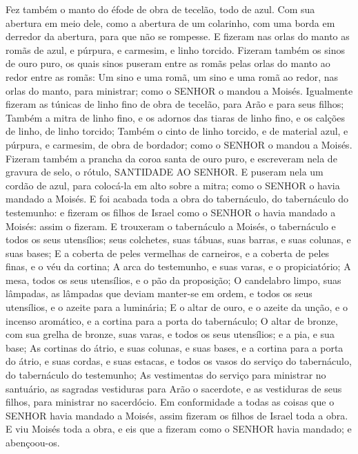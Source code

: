 {Fez também o manto do éfode de obra de tecelão, todo de azul.
Com sua abertura em meio dele, como a abertura de um colarinho, com uma borda em derredor da abertura, para que não se rompesse.
E fizeram nas orlas do manto as romãs de azul, e púrpura, e carmesim, e linho torcido.
Fizeram também os sinos de ouro puro, os quais sinos puseram entre as romãs pelas orlas do manto ao redor entre as romãs:
Um sino e uma romã, um sino e uma romã ao redor, nas orlas do manto, para ministrar; como o SENHOR o mandou a Moisés.
Igualmente fizeram as túnicas de linho fino de obra de tecelão, para Arão e para seus filhos;
Também a mitra de linho fino, e os adornos das tiaras de linho fino, e os calções de linho, de linho torcido;
Também o cinto de linho torcido, e de material azul, e púrpura, e carmesim, de obra de bordador; como o SENHOR o mandou a Moisés.
Fizeram também a prancha da coroa santa de ouro puro, e escreveram nela de gravura de selo, o rótulo, SANTIDADE AO SENHOR.
E puseram nela um cordão de azul, para colocá-la em alto sobre a mitra; como o SENHOR o havia mandado a Moisés.
E foi acabada toda a obra do tabernáculo, do tabernáculo do testemunho: e fizeram os filhos de Israel como o SENHOR o havia mandado a Moisés: assim o fizeram.
E trouxeram o tabernáculo a Moisés, o tabernáculo e todos os seus utensílios; seus colchetes, suas tábuas, suas barras, e suas colunas, e suas bases;
E a coberta de peles vermelhas de carneiros, e a coberta de peles finas, e o véu da cortina;
A arca do testemunho, e suas varas, e o propiciatório;
A mesa, todos os seus utensílios, e o pão da proposição;
O candelabro limpo, suas lâmpadas, as lâmpadas que deviam manter-se em ordem, e todos os seus utensílios, e o azeite para a luminária;
E o altar de ouro, e o azeite da unção, e o incenso aromático, e a cortina para a porta do tabernáculo;
O altar de bronze, com sua grelha de bronze, suas varas, e todos os seus utensílios; e a pia, e sua base;
As cortinas do átrio, e suas colunas, e suas bases, e a cortina para a porta do átrio, e suas cordas, e suas estacas, e todos os vasos do serviço do tabernáculo, do tabernáculo do testemunho;
As vestimentas do serviço para ministrar no santuário, as sagradas vestiduras para Arão o sacerdote, e as vestiduras de seus filhos, para ministrar no sacerdócio.
Em conformidade a todas as coisas que o SENHOR havia mandado a Moisés, assim fizeram os filhos de Israel toda a obra.
E viu Moisés toda a obra, e eis que a fizeram como o SENHOR havia mandado; e abençoou-os.

}
